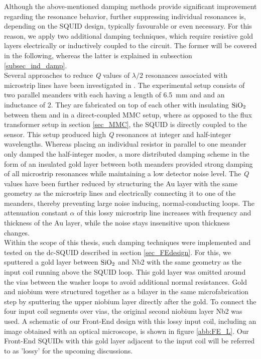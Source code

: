 Although the above-mentioned damping methods provide significant improvement regarding the resonance behavior, further suppressing individual resonances is, depending on the SQUID design, typically favourable or even necessary. For this reason, we apply two additional damping techniques, which require resistive gold layers electrically or inductively coupled to the circuit. The former will be covered in the following, whereas the latter is explained in subsection \ref{subsec_ind_damp}. \\
Several approaches to reduce \textit{Q} values of $\lambda/2$ resonances associated with microstrip lines have been investigated in \cite{Boyd2022}. The experimental setup consists of two parallel meanders with each having a length of \qty{6.5}{\milli\metre} and and an inductance of \qty{2}{\nH}. They are fabricated on top of each other with insulating $\rm SiO_2$ between them and in a direct-coupled MMC setup, where as opposed to the flux transformer setup in section \ref{sec_MMC}, the SQUID is directly coupled to the sensor. This setup produced high \textit{Q} resonances at integer and half-integer wavelengths. Whereas placing an individual resistor in parallel to one meander only damped the half-integer modes, a more distributed damping scheme in the form of an insulated gold layer between both meanders provided strong damping of all microstrip resonances while maintaining a low detector noise level. The \textit{Q} values have been further reduced by structuring the Au layer with the same geometry as the microstrip lines and electrically connecting it to one of the meanders, thereby preventing large noise inducing, normal-conducting loops. The attenuation constant $\alpha$ of this lossy microstrip line increases with frequency and thickness of the Au layer, while the noise stays insensitive upon thickness changes. \\
Within the scope of this thesis, such damping techniques were implemented and tested on the dc-SQUID described in section \ref{sec_FEdesign}. For this, we sputtered a gold layer between $\rm SiO_2$ and Nb2 with the same geometry as the input coil running above the SQUID loop. This gold layer was omitted around the vias between the washer loops to avoid additional normal resistances. Gold and niobium were structured together as a bilayer in the same microfabrication step by sputtering the upper niobium layer directly after the gold. To connect the four input coil segments over vias, the original second niobium layer Nb2 was used. A schematic of our Front-End design with this lossy input coil, including an image obtained with an optical microscope, is shown in figure \ref{abb:FE_L}. Our Front-End SQUIDs with this gold layer adjacent to the input coil will be referred to as 'lossy' for the upcoming discussions. 

